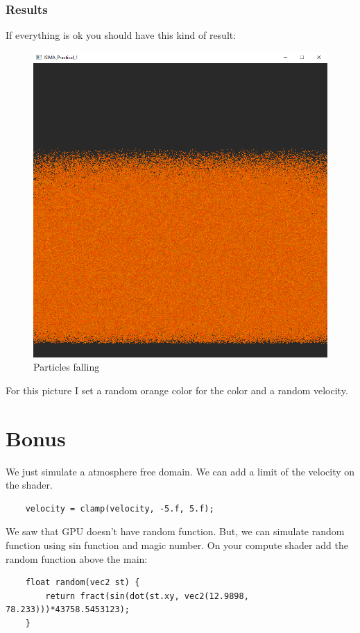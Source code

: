 \documentclass{article}
\begin{document}
\subsubsection{Results}
If everything is ok you should have this kind of result:
\begin{figure}[H]
	\centering
	\includegraphics[scale=0.5]{images/result_simple.png}
	\caption{Particles falling}
\end{figure}
For this picture I set a random orange color for the color and a random velocity.\\

\section{Bonus}
We just simulate a atmosphere free domain. We can add a limit of the velocity on the shader.
\begin{lstlisting}
	velocity = clamp(velocity, -5.f, 5.f);
\end{lstlisting}
We saw that GPU doesn't have random function. But, we can simulate random function using sin function and magic number. On your compute shader add the random function above the main:
\begin{lstlisting}
	float random(vec2 st) {
		return fract(sin(dot(st.xy, vec2(12.9898, 78.233)))*43758.5453123);
	}
\end{lstlisting}
\end{document}
